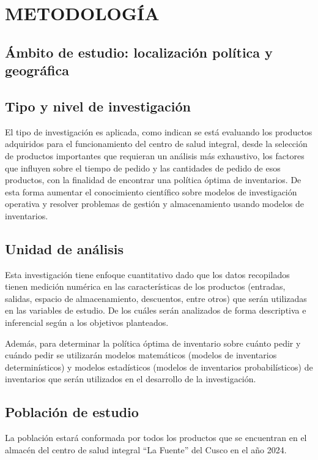 \newpage
\chapter{METODOLOGÍA}

\section{Ámbito de estudio: localización política y geográfica}

\section{Tipo y nivel de investigación}
El tipo de investigación es aplicada, como indican \cite{hernandez2020metodologia} se está evaluando los productos adquiridos para el funcionamiento del centro de salud integral, desde la selección de productos importantes que requieran un análisis más exhaustivo, los factores que influyen sobre el tiempo de pedido y las cantidades de pedido de esos productos, con la finalidad de encontrar una política óptima de inventarios. De esta forma aumentar el conocimiento científico sobre modelos de investigación operativa y resolver problemas de gestión y almacenamiento usando modelos de inventarios. 

\section{Unidad de análisis}
Esta investigación tiene enfoque cuantitativo dado que los datos recopilados tienen medición numérica en las características de los productos (entradas, salidas, espacio de almacenamiento, descuentos, entre otros) que serán utilizadas en las variables de estudio. De los cuáles serán analizados de forma descriptiva e inferencial según a los objetivos planteados. 

Además, para determinar la política óptima de inventario sobre cuánto pedir y cuándo pedir se utilizarán modelos matemáticos (modelos de inventarios determinísticos) y modelos estadísticos (modelos de inventarios probabilísticos) de inventarios que serán utilizados en el desarrollo de la investigación. \citep{hernandez2020metodologia}

\section{Población de estudio}
La población estará conformada por todos los productos que se encuentran en el almacén del centro de salud integral ``La Fuente'' del Cusco en el año 2024.

